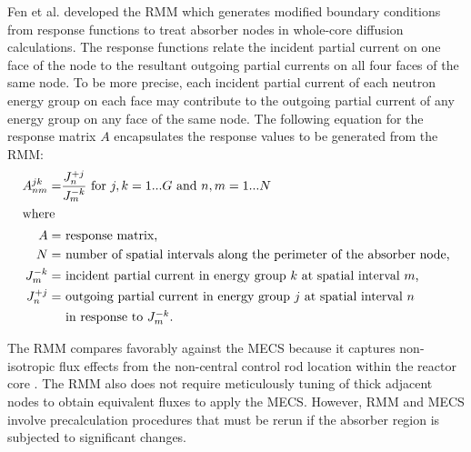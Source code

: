 Fen et al. \cite{fen_modelling_1992} developed the \gls{RMM} which generates modified boundary
conditions from response functions to treat absorber nodes in whole-core diffusion calculations.
The response functions relate the incident partial current on one face of the node to the resultant
outgoing partial currents on all four faces of the same node. To be more precise, each incident
partial current of each neutron energy group on each face may contribute to the outgoing partial
current of any energy group on any face of the same node. The following equation for the response
matrix $A$ encapsulates the response values to be generated from the \gls{RMM}:
%
\begin{align}
  A^{jk}_{nm} =& \frac{J^{+j}_n}{J^{-k}_m} \mbox{ for } j,k=1...G \mbox{ and } n,m=1...N
  \label{eq:rmm} \\
  \shortintertext{where}
  A =& \mbox{ response matrix,} \nonumber \\
  N =& \mbox{ number of spatial intervals along the perimeter of the absorber node,} \nonumber \\
  J^{-k}_m =& \mbox{ incident partial current in energy group $k$ at spatial interval $m$,}
    \nonumber \\
  J^{+j}_n =& \mbox{ outgoing partial current in energy group $j$ at spatial interval $n$}
    \nonumber \\
  &\mbox{ in response to $J^{-k}_m$.} \nonumber
\end{align}

The \gls{RMM} compares favorably against the \gls{MECS} because it captures non-isotropic flux
effects from the non-central control rod location within the reactor core
\cite{fen_modelling_1992}. The \gls{RMM} also does not require
meticulously tuning of thick adjacent nodes to obtain equivalent fluxes to apply the \gls{MECS}.
However, \gls{RMM} and \gls{MECS} involve precalculation procedures that must be rerun if the
absorber region is subjected to significant changes.

